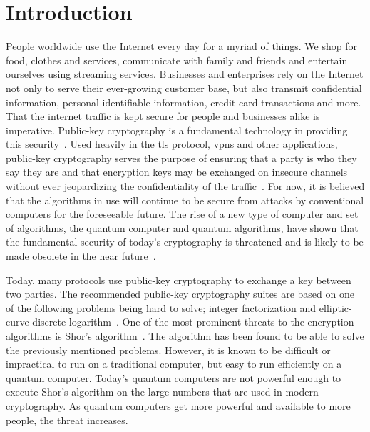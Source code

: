 \chapter{Introduction}
\label{chapter:introduction}


People worldwide use the Internet every day for a myriad of things. We shop for food, clothes and services, communicate with family and friends and entertain ourselves using streaming services. Businesses and enterprises rely on the Internet not only to serve their ever-growing customer base, but also transmit confidential information, personal identifiable information, credit card transactions and more. That the internet traffic is kept secure for people and businesses alike is imperative. Public-key cryptography is a fundamental technology in providing this security~\cite{rfc8446}. Used heavily in the \gls{tls} protocol, \glspl{vpn} and other applications, public-key cryptography serves the purpose of ensuring that a party is who they say they are and that encryption keys may be exchanged on insecure channels without ever jeopardizing the confidentiality of the traffic~\cite{rfc8446}. For now, it is believed that the algorithms in use will continue to be secure from attacks by conventional computers for the foreseeable future. The rise of a new type of computer and set of algorithms, the quantum computer and quantum algorithms, have shown that the fundamental security of today's cryptography is threatened and is likely to be made obsolete in the near future~\cite{bernstein2017,ibm:z15:2019,microsoft2020}.

Today, many protocols use public-key cryptography to exchange a key between two parties. The recommended public-key cryptography suites are based on one of the following problems being hard to solve; integer factorization and elliptic-curve discrete logarithm~\cite{nsa2015, nist2019}. One of the most prominent threats to the encryption algorithms is Shor's algorithm~\cite{shor1997}. The algorithm has been found to be able to solve the previously mentioned problems. However, it is known to be difficult or impractical to run on a traditional computer, but easy to run efficiently on a quantum computer. Today's quantum computers are not powerful enough to execute Shor's algorithm on the large numbers that are used in modern cryptography. As quantum computers get more powerful and available to more people, the threat increases.

